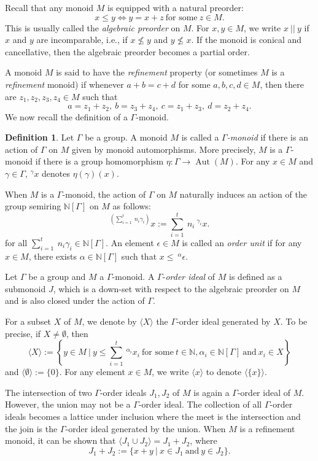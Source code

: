 \documentclass[a4paper,reqno,12pt]{amsart}
\numberwithin{equation}{section}
\theoremstyle{definition}
\newtheorem{dfn}[thm]{Definition}
\theoremstyle{remark}
\newcommand{\Aut}{\operatorname{Aut}}
\begin{document}
Recall that any monoid $M$ is equipped with a natural preorder: \[x\le y\Leftrightarrow y=x+z~\text{for some}~z\in M.\] This is usually called the \emph{algebraic preorder} on $M$. For $x,y\in M$, we write $x~||~y$ if $x$ and $y$ are incomparable, i.e., if $x\nleq y$ and $y\nleq x$. If the monoid is conical and cancellative, then the algebraic preorder becomes a partial order. 

A monoid $M$ is said to have the \emph{refinement} property (or sometimes $M$ is a \emph{refinement} monoid) if whenever $a+b=c+d$ for some $a,b,c,d\in M$, then there are $z_1,z_2,z_3,z_4\in M$ such that \[a=z_1+z_2,~b=z_3+z_4,~c=z_1+z_3,~d=z_2+z_4.\]
We now recall the definition of a $\Gamma$-monoid. 
\begin{dfn}\label{def Gamma-monoid}
Let $\Gamma$ be a group. A monoid $M$ is called a \emph{$\Gamma$-monoid} if there is an action of $\Gamma$ on $M$ given by monoid automorphisms. More precisely, $M$ is a $\Gamma$-monoid if there is a group homomorphism $\eta:\Gamma\longrightarrow \Aut(M)$. For any $x\in M$ and $\gamma\in \Gamma$, $^\gamma x$ denotes $\eta(\gamma)(x)$.    
\end{dfn}
When $M$ is a $\Gamma$-monoid, the action of $\Gamma$ on $M$ naturally induces an action of the group semiring $\mathbb{N}[\Gamma]$ on $M$ as follows: \[^{\left(\displaystyle{\sum_{i=1}^{t}}~n_i\gamma_i\right)}x:=\displaystyle{\sum_{i=1}^{t}}~n_i~^{\gamma_i}x.\] for all $\displaystyle{\sum_{i=1}^{t}}~n_i\gamma_i\in \mathbb{N}[\Gamma]$. An element $\epsilon\in M$ is called an \emph{order unit} if for any $x\in M$, there exists $\alpha\in \mathbb{N}[\Gamma]$ such that $x\le~^\alpha \epsilon$. 

Let $\Gamma$ be a group and $M$ a $\Gamma$-monoid. A $\Gamma$-\emph{order ideal} of $M$ is defined as a submonoid $J$, which is a down-set with respect to the algebraic preorder on $M$ and is also closed under the action of $\Gamma$. 

For a subset $X$ of $M$, we denote by $\langle X\rangle$ the $\Gamma$-order ideal generated by $X$. To be precise, if $X\neq \emptyset$, then \[\langle X\rangle:=\left\{y\in M~|~y\le \displaystyle{\sum_{i=1}^{t}}~^{\alpha_i}x_i~\text{for some}~t\in \mathbb{N},\alpha_i\in \mathbb{N}[\Gamma]~\text{and}~x_i\in X\right\}\] and $\langle \emptyset\rangle:=\{0\}$. For any element $x\in M$, we write $\langle x \rangle$ to denote $\langle \{x\}\rangle$. 

The intersection of two $\Gamma$-order ideals $J_1,J_2$ of $M$ is again a $\Gamma$-order ideal of $M$. However, the union may not be a $\Gamma$-order ideal. The collection of all $\Gamma$-order ideals becomes a lattice under inclusion where the meet is the intersection and the join is the $\Gamma$-order ideal generated by the union. When $M$ is a refinement monoid, it can be shown that $\langle J_1\cup J_2\rangle=J_1+J_2$, where \[J_1+J_2:=\{x+y~|~x\in J_1~\text{and}~y\in J_2\}.\] 
\end{document}
